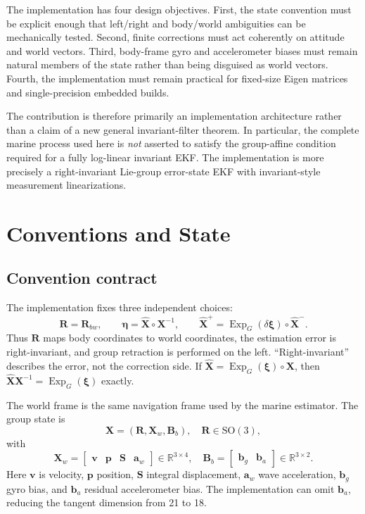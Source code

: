 \documentclass[conference]{IEEEtran}
\newcommand{\SO}{\mathrm{SO}}
\newcommand{\R}{\mathbb{R}}
\DeclareMathOperator{\Exp}{Exp}
\theoremstyle{bodysmall}
\begin{document}
The implementation has four design objectives. First, the state convention must be explicit enough that left/right and body/world ambiguities can be mechanically tested. Second, finite corrections must act coherently on attitude and world vectors. Third, body-frame gyro and accelerometer biases must remain natural members of the state rather than being disguised as world vectors. Fourth, the implementation must remain practical for fixed-size Eigen matrices and single-precision embedded builds.

The contribution is therefore primarily an implementation architecture rather than a claim of a new general invariant-filter theorem. In particular, the complete marine process used here is \emph{not} asserted to satisfy the group-affine condition required for a fully log-linear invariant EKF. The implementation is more precisely a right-invariant Lie-group error-state EKF with invariant-style measurement linearizations.

\section{Conventions and State}
\subsection{Convention contract}
The implementation fixes three independent choices:
\begin{equation}
\bm{R}=\bm{R}_{bw},\qquad \bm{\eta}=\hat {\bm{X}}\circ \bm{X}^{-1},\qquad
\hat {\bm{X}}^+=\Exp_G(\delta\bm{\xi})\circ\hat {\bm{X}}^-.
\end{equation}
Thus $\bm{R}$ maps body coordinates to world coordinates, the estimation error is right-invariant, and group retraction is performed on the left. ``Right-invariant'' describes the error, not the correction side. If $\hat {\bm{X}}=\Exp_G(\bm{\xi})\circ \bm{X}$, then $\hat {\bm{X}} \bm{X}^{-1}=\Exp_G(\bm{\xi})$ exactly.

The world frame is the same navigation frame used by the marine estimator. The group state is
\begin{equation}
\bm{X}=(\bm{R},\bm{X}_w,\bm{B}_b),\quad \bm{R}\in\SO(3),
\end{equation}
with
\begin{equation}
\bm{X}_w=\begin{bmatrix}\bm{v}&\bm{p}&\bm{S}&\bm{a}_w\end{bmatrix}\in\R^{3\times4},\quad
\bm{B}_b=\begin{bmatrix}\bm{b}_g&\bm{b}_a\end{bmatrix}\in\R^{3\times2}.
\end{equation}
Here $\bm{v}$ is velocity, $\bm{p}$ position, $\bm{S}$ integral displacement, $\bm{a}_w$ wave acceleration, $\bm{b}_g$ gyro bias, and $\bm{b}_a$ residual accelerometer bias. The implementation can omit $\bm{b}_a$, reducing the tangent dimension from 21 to 18.
\end{document}
